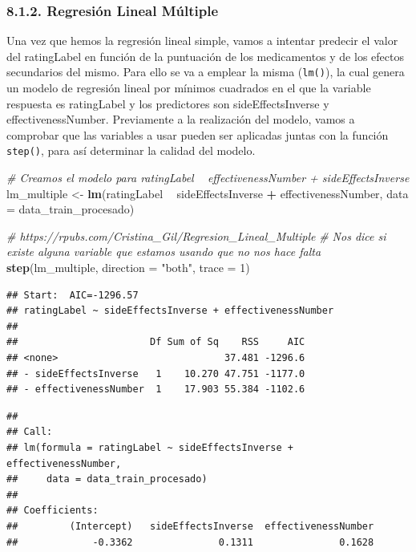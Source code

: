\documentclass[spanish,]{article}
\newenvironment{Shaded}{\begin{snugshade}}{\end{snugshade}}
\newcommand{\KeywordTok}[1]{\textcolor[rgb]{0.13,0.29,0.53}{\textbf{#1}}}
\newcommand{\DataTypeTok}[1]{\textcolor[rgb]{0.13,0.29,0.53}{#1}}
\newcommand{\DecValTok}[1]{\textcolor[rgb]{0.00,0.00,0.81}{#1}}
\newcommand{\StringTok}[1]{\textcolor[rgb]{0.31,0.60,0.02}{#1}}
\newcommand{\CommentTok}[1]{\textcolor[rgb]{0.56,0.35,0.01}{\textit{#1}}}
\newcommand{\OperatorTok}[1]{\textcolor[rgb]{0.81,0.36,0.00}{\textbf{#1}}}
\newcommand{\NormalTok}[1]{#1}
\begin{document}
\subsubsection{8.1.2. Regresión Lineal
Múltiple}\label{regresion-lineal-multiple}

Una vez que hemos la regresión lineal simple, vamos a intentar predecir
el valor del ratingLabel en función de la puntuación de los medicamentos
y de los efectos secundarios del mismo. Para ello se va a emplear la
misma (\texttt{lm()}), la cual genera un modelo de regresión lineal por
mínimos cuadrados en el que la variable respuesta es ratingLabel y los
predictores son sideEffectsInverse y effectivenessNumber. Previamente a
la realización del modelo, vamos a comprobar que las variables a usar
pueden ser aplicadas juntas con la función \texttt{step()}, para así
determinar la calidad del modelo.

\begin{Shaded}
\begin{Highlighting}[]
\CommentTok{# Creamos el modelo para ratingLabel ~ effectivenessNumber + sideEffectsInverse }
\NormalTok{lm_multiple <-}\StringTok{ }\KeywordTok{lm}\NormalTok{(ratingLabel }\OperatorTok{~}\StringTok{ }\NormalTok{sideEffectsInverse }\OperatorTok{+}\StringTok{ }\NormalTok{effectivenessNumber, }
                  \DataTypeTok{data =}\NormalTok{ data_train_procesado)}

\CommentTok{# https://rpubs.com/Cristina_Gil/Regresion_Lineal_Multiple}
\CommentTok{# Nos dice si existe alguna variable que estamos usando que no nos hace falta}
\KeywordTok{step}\NormalTok{(lm_multiple, }\DataTypeTok{direction =} \StringTok{"both"}\NormalTok{, }\DataTypeTok{trace =} \DecValTok{1}\NormalTok{)}
\end{Highlighting}
\end{Shaded}

\begin{verbatim}
## Start:  AIC=-1296.57
## ratingLabel ~ sideEffectsInverse + effectivenessNumber
## 
##                       Df Sum of Sq    RSS     AIC
## <none>                             37.481 -1296.6
## - sideEffectsInverse   1    10.270 47.751 -1177.0
## - effectivenessNumber  1    17.903 55.384 -1102.6
\end{verbatim}

\begin{verbatim}
## 
## Call:
## lm(formula = ratingLabel ~ sideEffectsInverse + effectivenessNumber, 
##     data = data_train_procesado)
## 
## Coefficients:
##         (Intercept)   sideEffectsInverse  effectivenessNumber  
##             -0.3362               0.1311               0.1628
\end{verbatim}
\end{document}
